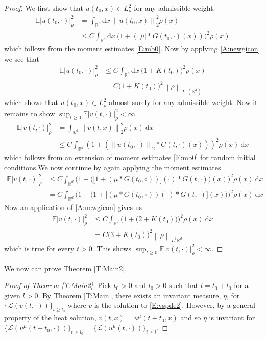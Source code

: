 \documentclass[a4paper,11pt]{article}%
\numberwithin{equation}{section}
\theoremstyle{plain}
\theoremstyle{definition}
\newcommand{\R}{\mathbb{R}}
\newcommand{\E}{\mathbb{E}}
\newcommand{\Norm}[1]{\left\|  #1   \right\|}
\newcommand{\ud}{\ensuremath{ \mathrm{d} }}
\begin{document}
\begin{proof} We first show that $u(t_0,x)\in L^2_\rho$ for any admissible weight.
	\begin{align*}
		\E |u(t_0,\cdot)|_\rho^2 &= \int_{\R^d}\ud x \: \Norm{u(t_0,x)}_2^2\rho(x)
													 \\& \le C  \int_{\R^d}\ud x \: \big(1+(|\mu|*G(t_0,\cdot)(x))\big)^2\rho(x)
	\end{align*}
	which follows from the moment estimates \eqref{E:mb0}. Now by applying \eqref{A:newgicon} we see that
	\begin{align*}
		\E |u(t_0,\cdot)|_\rho^2 & \le C \int_{\R^d}\ud x \: \big(1+K(t_0)\big)^2\rho(x)
													 \\& = C\big(1+K(t_0)\big)^2\Norm{\rho}_{L^1(\R^d)}
	\end{align*}
	which shows that $u(t_0,x)\in L^2_\rho$ almost surely for any admissible weight. Now it remains to show $\sup_{t\ge 0} \E |v(t,\cdot)|_\rho^2 < \infty$.
	\begin{align*}
		\E |v(t,\cdot)|_\rho^2 &= \int_{\R^d}\Norm{v(t,x)}_2^2\rho(x) \: \ud x
												 \\& \le C \int_{\R^d} \left( 1+\left( \Norm{u(t_0,\cdot)}_2 * G(t,\cdot)(x) \right) \right)^2\rho(x) \: \ud x
	\end{align*}
	which follows from an extension of moment estimates \eqref{E:mb0} for random initial conditions.We now continue by again applying the moment estimates.
	\begin{align*}
		\E |v(t,\cdot)|_\rho^2 & \le C \int_{\R^d} \bigg( 1+ \big(\big[1+(\mu*G(t_0,\circ))\big](\cdot) * G(t,\cdot)\big)(x)  \bigg)^2\rho(x) \: \ud x
												 \\& = C \int_{\R^d} \bigg( 1+\bigg( 1+\big[(\mu*G(t_0,\circ))(\cdot) * G(t,\cdot)\big](x) \bigg) \bigg)^2\rho(x) \: \ud x
	\end{align*}
	Now an application of \eqref{A:newgicon} gives us
	\begin{align*}
		\E |v(t,\cdot)|_\rho^2 &\le C \int_{\R^d} \bigg( 1+\bigg( 2+K(t_0) \bigg) \bigg)^2\rho(x) \: \ud x
												 \\&= C\bigg( 3 +K(t_0) \bigg)^2 \Norm{\rho}_{L^1{\R^d}}
	\end{align*}
	which is true for every $t>0$. This shows $\sup_{t\ge 0} \E |v(t,\cdot)|_\rho^2 < \infty$.
\end{proof}

We now can prove Theorem \ref{T:Main2}.

\begin{proof}[Proof of Theorem \ref{T:Main2}] Pick $t_0>0$ and $l_0>0$ such that $l=t_0+l_0$ for a given $l >0$.  By Theorem
	\ref{T:Main}, there exists an invariant measure, $\eta$, for $\{\mathscr L(v(t,\cdot))\}_{t\ge l_0}$ where $v$ is
	the solution to \eqref{E:vspde2}. However, by a general property of the heat solution, $v(t,x)=u^\mu(t+t_0,x)$ and so
	$\eta$ is invariant for $\{\mathscr L(u^\mu(t+t_0,\cdot))\}_{t\ge l_0} = \{\mathscr L(u^\mu(t,\cdot))\}_{t\ge
		l}$.
\end{proof}
\end{document}
